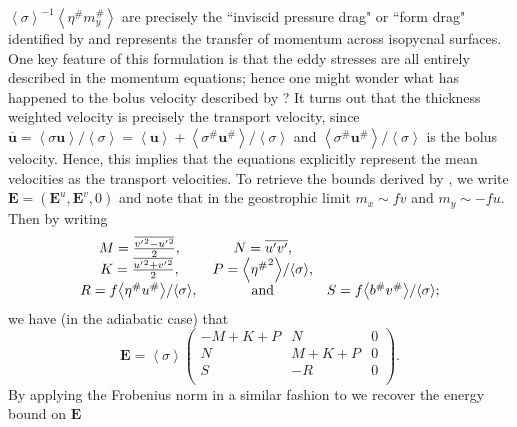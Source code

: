 \documentclass[12pt,a4paper]{report}
\newcommand*\thkmean[1]{\overline{#1}}
\newcommand*\thkres[1]{{#1}^{\prime}}
\newcommand*\nthkmean[1]{\left\langle{#1}\right\rangle}
\newcommand*\nthkres[1]{{#1}^{\#}}
\begin{document}
                   $\nthkmean{\sigma}^{-1}\nthkmean{\nthkres{\eta}\nthkres{m}_{y}}$ are
                   precisely the ``inviscid pressure drag"  or ``form drag" identified
                   by \cite{rhines1979theoretical} and represents the transfer of momentum
                   across isopycnal surfaces. One key feature of this formulation
                   is that the eddy stresses are all entirely described in the momentum
                   equations; hence one might wonder what has happened to 
                   the bolus velocity described by \cite{gent1995parameterizing}? 
                   It turns out that the thickness weighted velocity is precisely 
                   the transport velocity, since $\thkmean{\boldsymbol{u}}=\nthkmean{\sigma\boldsymbol{u}}/\nthkmean{\sigma}=\nthkmean{\boldsymbol{u}} + \nthkmean{\nthkres{\sigma}\nthkres{\boldsymbol{u}}}/\nthkmean{\sigma}$
                   and  $\nthkmean{\nthkres{\sigma}\nthkres{\boldsymbol{u}}}/\nthkmean{\sigma}$
                   is the bolus velocity. Hence, this implies that  the equations explicitly
                    represent the mean velocities as the  transport velocities.
                     To retrieve the bounds derived by \cite{marshall2012framework},
                     we write $\boldsymbol{E} = (\boldsymbol{E}^{u}, \boldsymbol{E}^{v}, 0)$
                     and note that in the geostrophic limit $m_x \sim fv$ and  $m_y \sim -fu$.
                     Then by writing 
                     \begin{equation}
                     \begin{array}{ccc}
                     M = \frac{\thkmean{{\thkres{v}}^{2} - {\thkres{u}}^{2}}}{2}, & 
                     N = \thkmean{\thkres{u}\thkres{v} }, \\
                     K = \frac{\thkmean{{\thkres{u}}^{2} + {\thkres{v}}^{2}}}{2}, & 
                     P =  {\nthkmean{{\nthkres{\eta}}^{2}}}/{\nthkmean{\sigma}},  \\ 
                     R =  f{\nthkmean{\nthkres{\eta}\nthkres{u}}}/{\nthkmean{\sigma}}, \, & \rm and  &  
                     S = f{\nthkmean{\nthkres{b}\nthkres{v}}}/{\nthkmean{\sigma}} ;
                     \end{array} 
                     \end{equation}
                     we have (in the adiabatic case) that
                     \begin{equation}
                     \boldsymbol{E}=\nthkmean{\sigma}\left(
                     \begin{array}{ccc}
                     -M+K+P & N & 0 \\
                     N & M+K+P & 0 \\
                     S & -R & 0 \\
                     \end{array}\right).
                     \end{equation}
                     By applying the Frobenius norm in a similar fashion to 
                     \cite{marshall2012framework} we recover the energy bound on
                      $\boldsymbol{E}$
                      
\end{document}
